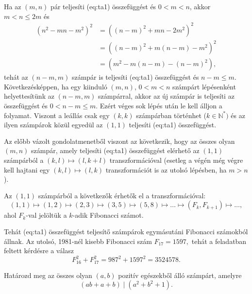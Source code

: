 \begin{solution}
Ha az $(m,n)$ pár teljesíti \aref({eq:ta1}) összefüggést és $0<m<n$,
akkor $m<n\le2m$ és 
\begin{align*}
(n^{2}-mn-m^{2})^{2} & =\left((n-m)^{2}+mn-2m^{2}\right)^{2}\\
 & =\left((n-m)^{2}+m(n-m)-m^{2}\right)^{2}\\
 & =\left(m^{2}-m(n-m)-(n-m)^{2}\right),
\end{align*}
tehát az $(n-m,m)$ számpár is teljesíti \aref({eq:ta1}) összefüggést
és $n-m\le m$. Következésképpen, ha egy kiinduló $(m,n)$, $0<m<n$
számpárt lépésenként helyettesítünk az $(n-m,m)$ számpárral, akkor
az új számpár is teljesíti az összefüggést és $0<n-m\le m$. Ezért
véges sok lépés után le kell álljon a folyamat. Viszont a leállás
csak egy $(k,k)$ számpárban történhet ($k\in\mathbb{N}^{*})$ és
az ilyen számpárok közül egyedül az $(1,1)$ teljesíti \aref({eq:ta1})
összefüggést.

Az előbb vázolt gondolatmenetből viszont az következik, hogy az összes
olyan $(m,n)$ számpár, amely teljesíti \aref({eq:ta1}) összefüggést
elérhető az $(1,1)$ számpárból a $(k,l)\mapsto(l,k+l)$ transzformációval
(esetleg a végén még végre kell hajtani egy $(k,l)\mapsto(l,k)$ transzformációt
is az utolsó lépésben, ha $m>n$).

Az $(1,1)$ számpárból a következők érhetők el a transzformációval:
\[
(1,1)\mapsto(1,2)\mapsto(2,3)\mapsto(3,5)\mapsto(5,8)\mapsto\dots\mapsto(F_{k},F_{k+1})\mapsto\dots,
\]
ahol $F_{k}$-val jelöltük a $k$-adik Fibonacci számot.

Tehát \aref({eq:ta1}) összefüggést teljesítő számpárok egymásutáni
Fibonacci számokból állnak. Az utolsó, 1981-nél kisebb Fibonacci szám
$F_{17}=1597,$ tehát a feladatban feltett kérdésre a válasz 
\[
F_{16}^{2}+F_{17}^{2}=987^{2}+1597^{2}=3524578.
\]
\end{solution}

\begin{extraproblem}
Határozd meg az összes olyan $(a,b)$ pozitív egészekből álló számpárt,
amelyre 
\[
(ab+a+b)\mid(a^{2}+b^{2}+1).
\]
\end{extraproblem}

